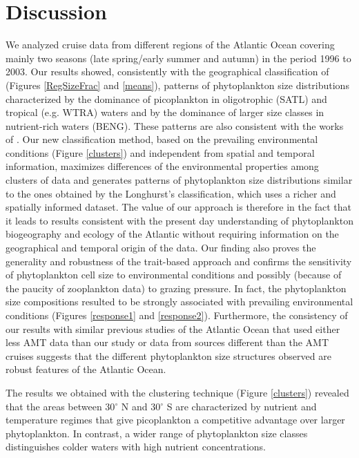 \section{Discussion}
We analyzed cruise data from different regions of the Atlantic Ocean covering mainly two seasons (late spring/early summer and autumn) in the period 1996 to 2003. Our results showed, consistently with the geographical classification of \citet{Longhurst2006} (Figures \ref{RegSizeFrac} and \ref{means}), patterns of phytoplankton size distributions characterized by the dominance of picoplankton in oligotrophic (SATL) and tropical (e.g. WTRA) waters and by the dominance of larger size classes in nutrient-rich waters (BENG). These patterns are also consistent with the works of \citet{Maranon2000, Maranon2001, Poulton2006, Moreno-Ostos2011, Huete-Ortega2011}. Our new classification method, based on the prevailing environmental conditions (Figure \ref{clusters}) and independent from spatial and temporal information, maximizes differences of the environmental properties among clusters of data and generates patterns of phytoplankton size distributions similar to the ones obtained by the Longhurst's classification, which uses a richer and spatially informed dataset. The value of our approach is therefore in the fact that it leads to results consistent with the present day understanding of phytoplankton biogeography and ecology of the Atlantic without requiring information on the geographical and temporal origin of the data. Our finding also proves the generality and robustness of the trait-based approach and confirms the sensitivity of phytoplankton cell size to environmental conditions and possibly (because of the paucity of zooplankton data) to grazing pressure. In fact, the phytoplankton size compositions resulted to be strongly associated with prevailing environmental conditions (Figures \ref{response1} and \ref{response2}). Furthermore, the consistency of our results with similar previous studies of the Atlantic Ocean that used either less AMT data than our study \citep{Maranon2000, Maranon2001, Poulton2006} or data from sources different than the AMT cruises \citep{Moreno-Ostos2011, Huete-Ortega2011} suggests that the different phytoplankton size structures observed are robust features of the Atlantic Ocean.

The results we obtained with the clustering technique (Figure \ref{clusters}) revealed that the areas between 30$^\circ$ N and 30$^\circ$ S are characterized by nutrient and temperature regimes that give picoplankton a competitive advantage over larger phytoplankton. In contrast, a wider range of phytoplankton size classes distinguishes colder waters with high nutrient concentrations.

